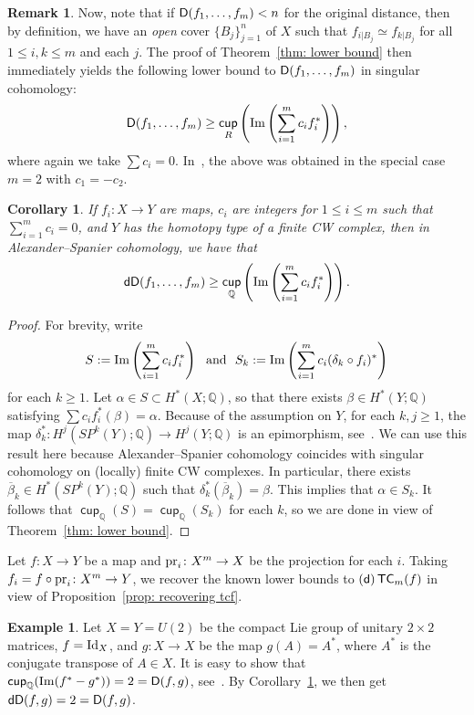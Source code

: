 \documentclass[amscd,amssymb,verbatim,10pt]{amsart}
\numberwithin{equation}{section}
\theoremstyle{plain}
\newtheorem{corollary}[theorem]{Corollary}
\theoremstyle{definition}
\newtheorem{remark}[theorem]{Remark}
\newtheorem{ex}[theorem]{Example}
\DeclareMathOperator{\TC}{{\mathsf{TC}}}
\DeclareMathOperator{\cu}{{\mathsf{cup}}}
\def\id{\protect\operatorname{Id}}
\def\Im{\protect\operatorname{Im}}
\def\pr{\protect\operatorname{pr}}
\def\Q{{\mathbb Q}}
\newcommand{\D}{{\sf {D}}}
\newcommand{\sd}{{(\sf {d})}}
\newcommand{\dD}{{\sf {dD}}}
\def\ov{\overline}
\begin{document}
\begin{remark}\label{rem: dist lower bound}
Now, note that if $\D(f_1,\dots,f_m)<n$ for the original distance, then by definition, 
we have an \emph{open} cover $\{B_j\}_{j=1}^n$ of $X$ such that 
$f_{i|B_j}\simeq f_{k|B_j}$ for all $1\le i,k\le m$ and each $j$.
The proof of Theorem~\ref{thm: lower bound} then immediately yields the following 
lower bound to $\D(f_1,\dots,f_m)$ in singular cohomology:
\[
\D(f_1,\dots,f_m)\ge \cu_R\left(\Im\left(\sum_{i=1}^mc_if_i^*\right)\right),
\]
where again we take $\sum c_i=0$.
In~\cite{MM}, the above was obtained in the special case $m=2$ with $c_1=-c_2$.
\end{remark}
\begin{corollary}\label{cor: same lower bound}
    If $f_i\colon X\to Y$ are maps, $c_i$ are integers for $1\le i \le m$ such that $\sum_{i=1}^mc_i=0$, and $Y$ has the homotopy type of a finite CW complex, then in Alexander--Spanier cohomology, we have that
\[
\dD(f_1,\dots,f_m)\ge \cu_{\Q}\left(\Im\left(\sum_{i=1}^mc_if_i^*\right)\right).
\]
\end{corollary}
\begin{proof}
For brevity, write 
\[
S:=\Im\left(\sum_{i=1}^m c_i f_i^*\right) \ \text{ and } \ S_k:=\Im\left(\sum_{i=1}^m c_i(\delta_{k}\circ f_i)^*\right)
\]
for each $k\ge 1$. Let $\alpha\in S\subset H^*(X;\Q)$, so that there exists $\beta\in H^*(Y;\Q)$ satisfying $\sum c_if_i^*(\beta)=\alpha$. Because of the assumption on $Y$, for each $k,j\ge 1$, the map $\delta_k^*\colon H^j(SP^k(Y);\Q)\to H^j(Y;\Q)$ is an epimorphism, see~\cite[Subsection~4.1]{DJ}. We can use this result here because Alexander--Spanier cohomology coincides with singular cohomology on (locally) finite CW complexes. In particular, there exists $\ov\beta_k\in H^*(SP^k(Y);\Q)$ such that $\delta_k^*(\ov\beta_k)=\beta$. This implies that $\alpha\in S_k$. It follows that $\cu_{\Q}(S)=\cu_{\Q}(S_k)$ for each $k$, so we are done in view of Theorem~\ref{thm: lower bound}.   
\end{proof}

Let $f\colon X\to Y$ be a map and $\pr_i\colon X^m\to X$ be the projection for each $i$. Taking $f_i=f\circ \pr_i\colon X^m\to Y$, we recover the known lower bounds to $\sd\TC_m(f)$ in view of Proposition~\ref{prop: recovering tcf}.

\begin{ex}
    Let $X=Y=U(2)$ be the compact Lie group of unitary $2\times 2$ matrices, $f=\id_X$, and $g\colon X\to X$ be the map $g(A)=A^*$, where $A^*$ is the conjugate transpose of $A\in X$. It is easy to show that $\cu_{\Q}(\Im(f^*-g^*))=2=\D(f,g)$, see~\cite[Example~5.4]{MM}. By Corollary~\ref{cor: same lower bound}, we then get $\dD(f,g)=2=\D(f,g)$.
\end{ex}
\end{document}
